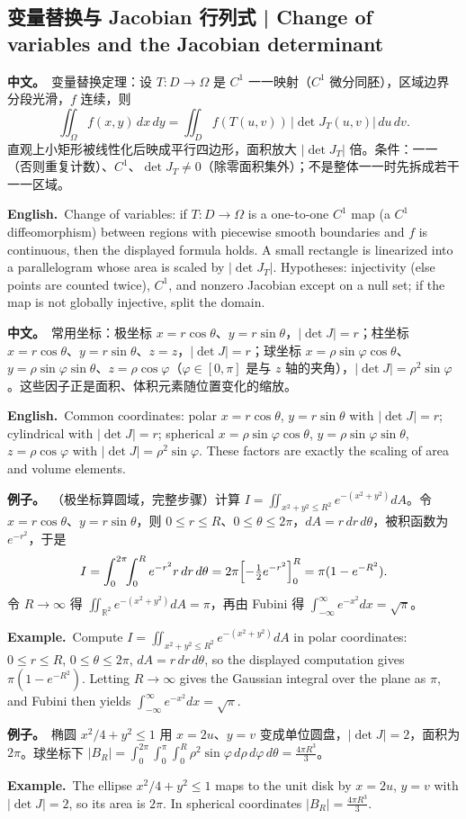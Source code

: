 \documentclass[UTF8,11pt,a4paper]{ctexart}
\newcommand{\BOTH}[2]{\par\noindent\textbf{中文。}\ #1\par\noindent\textbf{English.}\ #2\par}
\newcommand{\EX}[2]{\par\noindent\textbf{例子。}\ #1\par\noindent\textbf{Example.}\ #2\par}
\begin{document}
\subsection{变量替换与 Jacobian 行列式 | Change of variables and the Jacobian determinant}
\BOTH{变量替换定理：设 $T:D\to\Omega$ 是 $C^1$ 一一映射（$C^1$ 微分同胚），区域边界分段光滑，$f$ 连续，则
\[
\iint_\Omega f(x,y)\,dx\,dy=\iint_Df(T(u,v))\,|\det J_T(u,v)|\,du\,dv .
\]
直观上小矩形被线性化后映成平行四边形，面积放大 $|\det J_T|$ 倍。条件：一一（否则重复计数）、$C^1$、$\det J_T\ne0$（除零面积集外）；不是整体一一时先拆成若干一一区域。}{Change of variables: if $T:D\to\Omega$ is a one-to-one $C^1$ map (a $C^1$ diffeomorphism) between regions with piecewise smooth boundaries and $f$ is continuous, then the displayed formula holds. A small rectangle is linearized into a parallelogram whose area is scaled by $|\det J_T|$. Hypotheses: injectivity (else points are counted twice), $C^1$, and nonzero Jacobian except on a null set; if the map is not globally injective, split the domain.}
\BOTH{常用坐标：极坐标 $x=r\cos\theta$、$y=r\sin\theta$，$|\det J|=r$；柱坐标 $x=r\cos\theta$、$y=r\sin\theta$、$z=z$，$|\det J|=r$；球坐标 $x=\rho\sin\varphi\cos\theta$、$y=\rho\sin\varphi\sin\theta$、$z=\rho\cos\varphi$（$\varphi\in[0,\pi]$ 是与 $z$ 轴的夹角），$|\det J|=\rho^2\sin\varphi$。这些因子正是面积、体积元素随位置变化的缩放。}{Common coordinates: polar $x=r\cos\theta$, $y=r\sin\theta$ with $|\det J|=r$; cylindrical with $|\det J|=r$; spherical $x=\rho\sin\varphi\cos\theta$, $y=\rho\sin\varphi\sin\theta$, $z=\rho\cos\varphi$ with $|\det J|=\rho^2\sin\varphi$. These factors are exactly the scaling of area and volume elements.}
\EX{（极坐标算圆域，完整步骤）计算 $I=\iint_{x^2+y^2\le R^2}e^{-(x^2+y^2)}dA$。令 $x=r\cos\theta$、$y=r\sin\theta$，则 $0\le r\le R$、$0\le\theta\le2\pi$，$dA=r\,dr\,d\theta$，被积函数为 $e^{-r^2}$，于是
\[
I=\int_0^{2\pi}\!\!\int_0^R e^{-r^2}r\,dr\,d\theta
=2\pi\Bigl[-\tfrac12e^{-r^2}\Bigr]_0^R=\pi(1-e^{-R^2}).
\]
令 $R\to\infty$ 得 $\iint_{\mathbb R^2}e^{-(x^2+y^2)}dA=\pi$，再由 Fubini 得 $\int_{-\infty}^{\infty}e^{-x^2}dx=\sqrt\pi$。}{Compute $I=\iint_{x^2+y^2\le R^2}e^{-(x^2+y^2)}dA$ in polar coordinates: $0\le r\le R$, $0\le\theta\le2\pi$, $dA=r\,dr\,d\theta$, so the displayed computation gives $\pi(1-e^{-R^2})$. Letting $R\to\infty$ gives the Gaussian integral over the plane as $\pi$, and Fubini then yields $\int_{-\infty}^{\infty}e^{-x^2}dx=\sqrt\pi$.}
\EX{椭圆 $x^2/4+y^2\le1$ 用 $x=2u$、$y=v$ 变成单位圆盘，$|\det J|=2$，面积为 $2\pi$。球坐标下 $|B_R|=\int_0^{2\pi}\int_0^\pi\int_0^R\rho^2\sin\varphi\,d\rho\,d\varphi\,d\theta=\frac{4\pi R^3}{3}$。}{The ellipse $x^2/4+y^2\le1$ maps to the unit disk by $x=2u$, $y=v$ with $|\det J|=2$, so its area is $2\pi$. In spherical coordinates $|B_R|=\frac{4\pi R^3}{3}$.}
\end{document}
